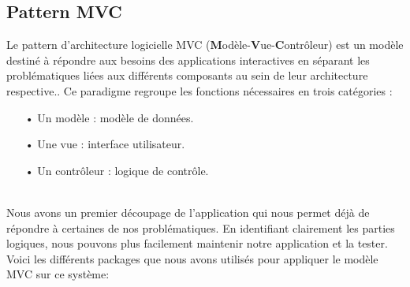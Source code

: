 \documentclass[a4paper]{report}
\begin{document}
\begin{spacing}{2}
\subsection{Pattern MVC}
Le pattern d'architecture logicielle MVC (\textbf{M}odèle-\textbf{V}ue-\textbf{C}ontrôleur) est un modèle destiné à répondre aux besoins des applications interactives en séparant les problématiques liées aux différents composants au sein de leur architecture respective..
Ce paradigme regroupe les fonctions nécessaires en trois catégories :\\
\begin{itemize}
\item[•] Un modèle : modèle de données.
\item[•] Une vue : interface utilisateur.
\item[•] Un contrôleur : logique de contrôle.\vspace{0.1cm}\\
\end{itemize}

\begin{minipage}{\linewidth}
	\label{f3}%
\end{minipage}\\
\cleardoublepage
Nous avons un premier découpage de l’application qui nous permet déjà de répondre à certaines de nos problématiques. En identifiant clairement les parties logiques, nous pouvons plus facilement maintenir notre application et la tester.\\
Voici les différents packages que nous avons utilisés pour appliquer le modèle MVC sur ce système:\\


\end{spacing}
\end{document}
